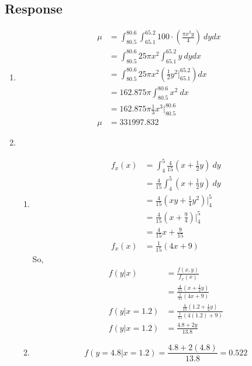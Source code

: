 \documentclass[13pt]{article}
\begin{document}
\subsection*{Response}
\begin{enumerate}[label=(\arabic*)]
\item 
  \begin{align*}
    \mu &= \int_{80.5}^{80.6}\int_{65.1}^{65.2} 100 \cdot
          \left( \frac{\pi x^2 y}{4} \right) \ dydx \\
        &= \int_{80.5}^{80.6} 25\pi x^2 \int_{65.1}^{65.2} y \ dydx \\
        &= \int_{80.5}^{80.6} 25\pi x^2 \left( \frac{1}{2}y^2
          \biggr\rvert_{65.1}^{65.2} \right)dx \\
        &= 162.875\pi \int_{80.5}^{80.6} x^2 \ dx \\
        &= 162.875\pi \frac{1}{3} x^3 \biggr\rvert_{80.5}^{80.6} \\
    \mu &= 331997.832
  \end{align*}
  
\item
  \begin{enumerate}[label=(\roman*)]
  \item
    \begin{align*}
      f_x(x)
      &= \int_{4}^{5} \frac{4}{15} \left( x + \frac{1}{2} y \right) \ dy \\
      &= \frac{4}{15} \int_{4}^{5} \left( x + \frac{1}{2} y \right) \ dy \\
      &= \frac{4}{15} \left( xy + \frac{1}{4} y^2 \right) \biggr\rvert_{4}^{5} \\
      &= \frac{4}{15} \left( x + \frac{9}{4} \right) \biggr\rvert_{4}^{5} \\
      &= \frac{4}{15}x + \frac{9}{15} \\
      f_x(x) &= \frac{1}{15} \left( 4x + 9 \right)
    \end{align*}
    So,
    \begin{align*}
      f(y | x) &= \frac{f(x, y)}{f_x(x)} \\
               &= \frac{\frac{4}{15} \left( x + \frac{1}{2}y \right)}
                 {\frac{1}{15} \left( 4x + 9 \right)} \\
      f(y | x = 1.2) &= \frac{\frac{4}{15} \left( 1.2 + \frac{1}{2}y \right)}
                       {\frac{1}{15} \left( 4(1.2) + 9 \right)} \\
      f(y | x = 1.2) &= \frac{4.8 + 2y}{13.8}
    \end{align*}
    
  \item \[f(y = 4.8 | x = 1.2) = \frac{4.8 + 2(4.8)}{13.8} = 0.522\]
  \end{enumerate}
\end{enumerate}
\end{document}
